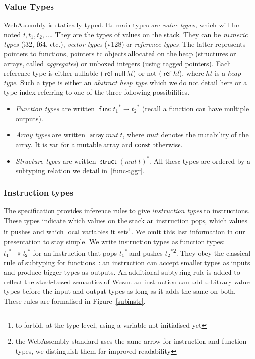\documentclass[a4paper,11pt]{article}
\DeclareMathOperator{\reft}{\textsf{ref}}
\DeclareMathOperator{\strt}{\textsf{struct}}
\DeclareMathOperator{\arrt}{\textsf{array}}
\DeclareMathOperator{\funt}{\textsf{func}}
\DeclareMathOperator{\refnullt}{\textsf{ref null}}
\begin{document}
\subsubsection{Value Types}
WebAssembly is statically typed. Its main types are \emph{value types}, which
will be noted $t, t_1, t_2, \ldots$. They are the types of values on the stack.
They can be \emph{numeric types} (\textsf{i32}, \textsf{f64}, etc.),
\emph{vector types} (\textsf{v128}) or \emph{reference types}. The latter
represents pointers to functions, pointers to objects allocated on the heap
(structures or arrays, called \emph{aggregates}) or unboxed integers (using
tagged pointers). Each reference type is either nullable ($\refnullt ht$) or not
($\reft ht$), where $ht$ is a \emph{heap type}. Such a type is either an
\emph{abstract heap type} which we do not detail here or a type index referring
to one of the three following possibilities.
\begin{itemize}
  \item \emph{Function types} are written
$\funt{t_1}^*\to{t_2}^*$ (recall a function can have multiple outputs).
  \item \emph{Array types} are written $\arrt mut\ t$, where $mut$ denotes the
mutability of the array. It is \textsf{var} for a mutable array and
$\textsf{const}$ otherwise.
\item \emph{Structure types} are written $\strt
  {(mut\ t)}^*$. All these types are ordered by a subtyping relation we detail
in~\ref{func-aggr}.
\end{itemize}

\subsubsection{Instruction types}
The specification provides inference rules to give \emph{instruction types} to
instructions. These types indicate which values on the stack an instruction
pops, which values it pushes and which local variables it sets\footnote{to
forbid, at the type level, using a variable not initialised yet}. We omit this
last information in our presentation to stay simple. We write instruction types
as function types: ${t_1}^*\twoheadrightarrow{t_2}^*$ for an instruction that
pops ${t_1}^*$ and pushes ${t_2}^*$\footnote{the WebAssembly standard uses the
same arrow for instruction and function types, we distinguish them for improved
readability}. They obey the classical rule of subtyping for
functions~\cite{cardelli1988semantics}: an instruction can accept smaller types
as inputs and produce bigger types as outputs.
An additional subtyping rule is added to reflect the stack-based semantics of
Wasm: an instruction can add arbitrary value types before the input and output
types as long as it adds the same on both. These rules are formalised in
Figure~\ref{subinstr}.
\end{document}

